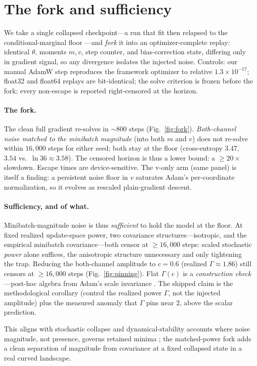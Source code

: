 \section{The fork and sufficiency}
\label{sec:fork}

We take a single collapsed checkpoint---a run that fit then relapsed to the conditional-marginal floor \citep{antigrok}---and \emph{fork} it into an optimizer-complete replay: identical $\theta$, moments $m,v$, step counter, and bias-correction state, differing only in gradient signal, so any divergence isolates the injected noise. Controls: our manual AdamW \citep{adam} step reproduces the framework optimizer to relative $1.3\times10^{-17}$; float32 and float64 replays are bit-identical; the solve criterion is frozen before the fork; every non-escape is reported right-censored at the horizon.

\paragraph{The fork.}
The clean full gradient re-solves in ${\sim}800$ steps (Fig.~\ref{fig:fork}). \emph{Both-channel noise matched to the minibatch magnitude} (into both $m$ and $v$) does not re-solve within $16{,}000$ steps for either seed; both stay at the floor (cross-entropy $3.47$, $3.54$ vs.\ $\ln 36 \approx 3.58$). The censored horizon is thus a lower bound: a $\ge 20\times$ slowdown. Escape times are device-sensitive. The v-only arm (same panel) is itself a finding: a persistent noise floor in $v$ saturates Adam's per-coordinate normalization, so it evolves as rescaled plain-gradient descent.

\paragraph{Sufficiency, and of what.}
Minibatch-magnitude noise is thus \emph{sufficient} to hold the model at the floor. At fixed realized update-space power, two covariance structures---isotropic, and the empirical minibatch covariance---both censor at $\ge 16{,}000$ steps: scaled stochastic \emph{power} alone suffices, the anisotropic structure unnecessary and only tightening the trap. Reducing the both-channel amplitude to $c=0.6$ (realized $\Gamma\approx1.86$) still censors at $\ge 16{,}000$ steps (Fig.~\ref{fig:pinning}). Flat $\Gamma(c)$ is a \emph{construction check}---post-hoc algebra from Adam's scale invariance \citep{adam}. The shipped claim is the methodological corollary (control the realized power $\Gamma$, not the injected amplitude) plus the measured anomaly that $\Gamma$ pins near $2$, above the scalar prediction.

This aligns with stochastic collapse \citep{stochcollapse} and dynamical-stability accounts where noise magnitude, not presence, governs retained minima \citep{wumae,eoss}; the matched-power fork adds a clean separation of magnitude from covariance \citep{zhu} at a fixed collapsed state in a real curved landscape.